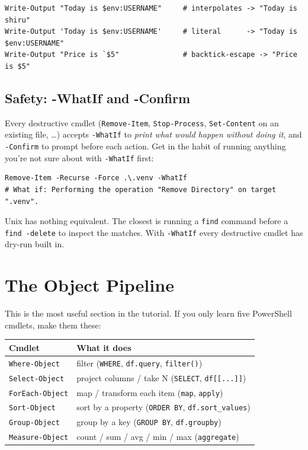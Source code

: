 \documentclass[11pt,a4paper]{article}
\newcommand{\cmd}[1]{\texttt{\textcolor{pwshKw}{#1}}}
\begin{document}
\begin{lstlisting}[style=pwshstyle]
Write-Output "Today is $env:USERNAME"     # interpolates -> "Today is shiru"
Write-Output 'Today is $env:USERNAME'     # literal      -> "Today is $env:USERNAME"
Write-Output "Price is `$5"               # backtick-escape -> "Price is $5"
\end{lstlisting}

\subsection*{Safety: -WhatIf and -Confirm}

Every destructive cmdlet (\cmd{Remove-Item}, \cmd{Stop-Process},
\cmd{Set-Content} on an existing file, \dots) accepts
\texttt{-WhatIf} to \emph{print what would happen without doing it},
and \texttt{-Confirm} to prompt before each action. Get in the habit
of running anything you're not sure about with \texttt{-WhatIf} first:

\begin{lstlisting}[style=pwshstyle]
Remove-Item -Recurse -Force .\.venv -WhatIf
# What if: Performing the operation "Remove Directory" on target ".venv".
\end{lstlisting}

\begin{compare}
Unix has nothing equivalent. The closest is running a \texttt{find}
command before a \texttt{find -delete} to inspect the matches. With
\texttt{-WhatIf} every destructive cmdlet has dry-run built in.
\end{compare}

\section{The Object Pipeline}

This is the most useful section in the tutorial. If you only learn
five PowerShell cmdlets, make them these:

\begin{center}
\begin{tabular}{ll}
\toprule
Cmdlet & What it does \\
\midrule
\cmd{Where-Object}    & filter (\texttt{WHERE}, \texttt{df.query}, \texttt{filter()})  \\
\cmd{Select-Object}   & project columns / take N (\texttt{SELECT}, \texttt{df[[...]]}) \\
\cmd{ForEach-Object}  & map / transform each item (\texttt{map}, \texttt{apply}) \\
\cmd{Sort-Object}     & sort by a property (\texttt{ORDER BY}, \texttt{df.sort\_values}) \\
\cmd{Group-Object}    & group by a key (\texttt{GROUP BY}, \texttt{df.groupby}) \\
\cmd{Measure-Object}  & count / sum / avg / min / max (\texttt{aggregate}) \\
\bottomrule
\end{tabular}
\end{center}
\end{document}
